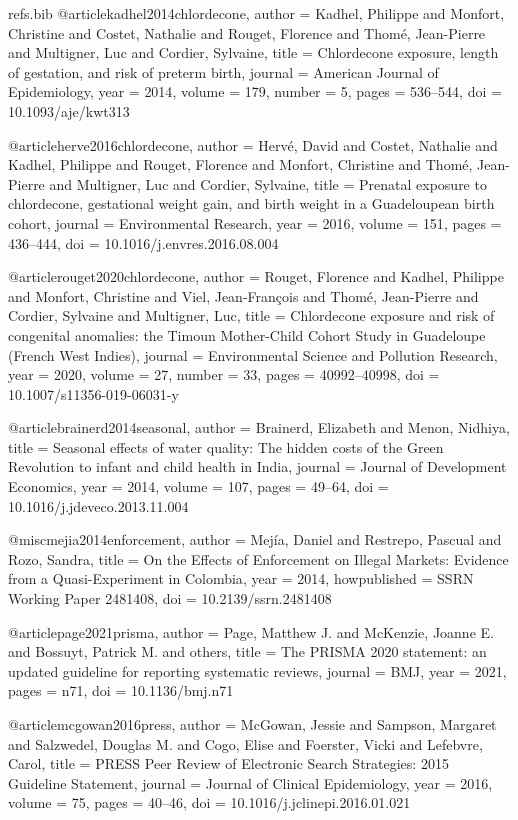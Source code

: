 \begin{filecontents*}[overwrite]{refs.bib}
@article{kadhel2014chlordecone,
  author  = {Kadhel, Philippe and Monfort, Christine and Costet, Nathalie and Rouget, Florence and Thomé, Jean-Pierre and Multigner, Luc and Cordier, Sylvaine},
  title   = {Chlordecone exposure, length of gestation, and risk of preterm birth},
  journal = {American Journal of Epidemiology},
  year    = {2014},
  volume  = {179},
  number  = {5},
  pages   = {536--544},
  doi     = {10.1093/aje/kwt313}
}

@article{herve2016chlordecone,
  author  = {Hervé, David and Costet, Nathalie and Kadhel, Philippe and Rouget, Florence and Monfort, Christine and Thomé, Jean-Pierre and Multigner, Luc and Cordier, Sylvaine},
  title   = {Prenatal exposure to chlordecone, gestational weight gain, and birth weight in a {Guadeloupean} birth cohort},
  journal = {Environmental Research},
  year    = {2016},
  volume  = {151},
  pages   = {436--444},
  doi     = {10.1016/j.envres.2016.08.004}
}

@article{rouget2020chlordecone,
  author  = {Rouget, Florence and Kadhel, Philippe and Monfort, Christine and Viel, Jean-François and Thomé, Jean-Pierre and Cordier, Sylvaine and Multigner, Luc},
  title   = {Chlordecone exposure and risk of congenital anomalies: the {Timoun} Mother-Child Cohort Study in {Guadeloupe} ({French West Indies})},
  journal = {Environmental Science and Pollution Research},
  year    = {2020},
  volume  = {27},
  number  = {33},
  pages   = {40992--40998},
  doi     = {10.1007/s11356-019-06031-y}
}

@article{brainerd2014seasonal,
  author  = {Brainerd, Elizabeth and Menon, Nidhiya},
  title   = {Seasonal effects of water quality: The hidden costs of the {Green Revolution} to infant and child health in {India}},
  journal = {Journal of Development Economics},
  year    = {2014},
  volume  = {107},
  pages   = {49--64},
  doi     = {10.1016/j.jdeveco.2013.11.004}
}

@misc{mejia2014enforcement,
  author       = {Mejía, Daniel and Restrepo, Pascual and Rozo, Sandra},
  title        = {On the Effects of Enforcement on Illegal Markets: Evidence from a Quasi-Experiment in {Colombia}},
  year         = {2014},
  howpublished = {SSRN Working Paper 2481408},
  doi          = {10.2139/ssrn.2481408}
}

@article{page2021prisma,
  author  = {Page, Matthew J. and McKenzie, Joanne E. and Bossuyt, Patrick M. and others},
  title   = {The {PRISMA} 2020 statement: an updated guideline for reporting systematic reviews},
  journal = {BMJ},
  year    = {2021},
  pages   = {n71},
  doi     = {10.1136/bmj.n71}
}

@article{mcgowan2016press,
  author  = {McGowan, Jessie and Sampson, Margaret and Salzwedel, Douglas M. and Cogo, Elise and Foerster, Vicki and Lefebvre, Carol},
  title   = {{PRESS} Peer Review of Electronic Search Strategies: 2015 Guideline Statement},
  journal = {Journal of Clinical Epidemiology},
  year    = {2016},
  volume  = {75},
  pages   = {40--46},
  doi     = {10.1016/j.jclinepi.2016.01.021}
}

\end{filecontents*}
